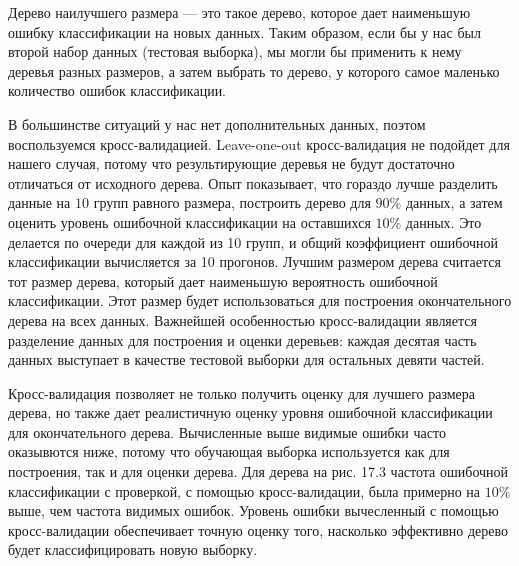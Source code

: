 Дерево наилучшего размера --- это такое дерево, которое дает наименьшую ошибку классификации на новых данных. Таким образом, если бы у нас был второй набор данных (тестовая выборка), мы могли бы применить к нему деревья разных размеров, а затем выбрать то дерево, у которого самое маленько количество ошибок классификации.

В большинстве ситуаций у нас нет дополнительных данных, поэтом воспользуемся кросс-валидацией. Leave-one-out кросс-валидация не подойдет для нашего случая, потому что результирующие деревья не будут достаточно отличаться от исходного дерева. Опыт показывает, что гораздо лучше разделить данные на $10$ групп равного размера, построить дерево для $90 \%$ данных, а затем оценить уровень ошибочной классификации на оставшихся $10 \%$ данных. Это делается по очереди для каждой из 10 групп, и общий коэффициент ошибочной классификации вычисляется за 10 прогонов. Лучшим размером дерева считается тот размер дерева, который дает наименьшую вероятность ошибочной классификации. Этот размер будет использоваться для построения окончательного дерева на всех данных. Важнейшей особенностью кросс-валидации является разделение данных для построения и оценки деревьев: каждая десятая часть данных выступает в качестве тестовой выборки для остальных девяти частей. 

Кросс-валидация позволяет не только получить оценку для лучшего размера дерева, но также дает реалистичную оценку уровня ошибочной классификации для окончательного дерева. Вычисленные выше видимые ошибки часто оказывются ниже, потому что обучающая выборка используется как для построения, так и для оценки дерева. Для дерева на рис. 17.3 частота ошибочной классификации с проверкой, с помощью кросс-валидации, была примерно на $10 \%$ выше, чем частота видимых ошибок. Уровень ошибки вычесленный с помощью кросс-валидации обеспечивает точную оценку того, насколько эффективно дерево будет классифицировать новую выборку.
